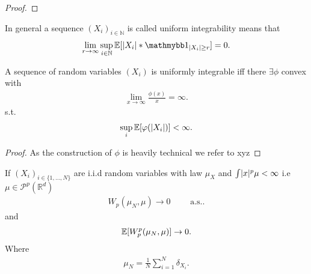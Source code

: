\begin{proof}

\end{proof}
\begin{remark}
  In general a sequence $(X_i)_{i \in  \mathbb{N}}$ is called uniform integrability means that 
 \begin{align*}
   \lim_{r \to  \infty} \sup_{i \in  \mathbb{N}} \E[\abs{X_i}*\cha_{\abs{X_i}\ge r}] = 0
 .\end{align*}
\end{remark}
\begin{lemma}\label{de_la_valle}
 A sequence of random variables $(X_i)$  is uniformly integrable iff there 
 $\exists \phi $ convex with
 \begin{align*}
   \lim_{x \to \infty} \frac{\phi(x)}{x} = \infty
 .\end{align*}
s.t.
\begin{align*}
 \sup_i \mathbb{E}[\varphi(\lvert X_i\rvert)] < \infty
.\end{align*}
\end{lemma}
\begin{proof}
  As the construction of $\phi $ is heavily technical we refer to xyz
\end{proof}
\begin{corollary}\label{wasserstein_convergence_arb}
  If $(X_i)_{i \in \{1,\ldots ,N\}  }$  are i.i.d random variables with law $\mu_X$ and $\int \lvert x\rvert^{p} \mu  < \infty $ i.e $\mu  \in  \mathcal{P}^p(\mathbb{R}^{d} ) $
 \begin{align*} 
 W_p(\mu_N,\mu ) \to  0 \qquad \text{ a.s.}
 .\end{align*}
 and 
 \begin{align*}
   \mathbb{E}[W_p^{p}(\mu_N,\mu ) ] \to 0
 .\end{align*}
 Where 
 \begin{align*}
   \mu_N = \frac{1}{N} \sum_{i=1}^{N} \delta_{X_i} 
 .\end{align*}
\end{corollary}
